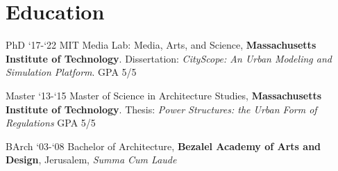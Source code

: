 \section*{Education}

\begin{tablist}

    \item[PhD] `17-`22 \tab MIT Media Lab: Media, Arts, and Science, \textbf{Massachusetts Institute of Technology}. Dissertation: \textit{CityScope: An Urban Modeling and Simulation Platform}. GPA 5/5
    \item[Master] `13-`15 \tab Master of Science in Architecture Studies, \textbf{Massachusetts Institute of Technology}. Thesis: \textit{Power Structures: the Urban Form of Regulations} GPA 5/5
    \item[BArch]  `03-`08  \tab Bachelor of Architecture, \textbf{Bezalel Academy of Arts and Design}, Jerusalem, \textit{Summa Cum Laude}

\end{tablist}
